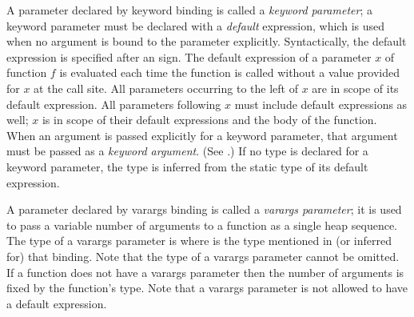 A parameter declared by keyword binding is called
a \emph{keyword parameter};
a keyword parameter must be declared with
a \emph{default} expression,
which is used when no argument is bound to the parameter explicitly.
Syntactically, the default expression is specified
after an \EXP{=} sign.
The default expression of a parameter $x$ of function $f$
is evaluated each time the function is called
without a value provided for $x$ at the call site.
All parameters occurring to the left of $x$
are in scope of its default expression.
All parameters following $x$ must include default expressions as well;
$x$ is in scope of their default expressions and the body of the function.
When an argument is passed explicitly for a keyword parameter,
that argument must be passed as a \emph{keyword argument}.
(See .)
If no type is declared for a keyword parameter,
the type is inferred from the static type of its default expression.

A parameter declared by varargs binding is called
a \emph{varargs parameter};
it is used to pass a variable number of arguments to a function
as a single heap sequence.
The type of a varargs parameter
    is  where  is
    the type mentioned in (or inferred for) that binding.
Note that the type of a varargs parameter cannot be omitted.
If a function does not have a varargs parameter
then the number of arguments is fixed by the function's type.
Note that a varargs parameter is not allowed to have a default expression.

